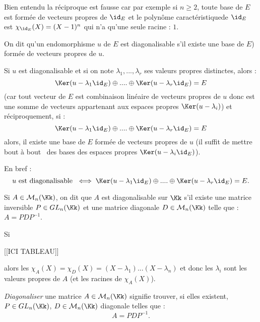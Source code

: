 \documentclass[class=report,crop=false]{standalone}
\newcommand{\GL}{GL}
\begin{document}
\begin{remarque*}
Bien entendu la réciproque est fausse car par exemple si $n \ge 2$, toute base de $E$ est formée de vecteurs propres de $\id_E$ et le polynôme caractéristiquede $\id_E$ est  $\chi_{\id_E}(X)=(X-1)^n$ qui n'a qu'une seule racine : $ 1$. 
\end{remarque*}

\begin{definition}[diagonalisable]
On dit qu'un endomorphisme $u$ de $E$ est diagonalisable  s'il existe une base de $E$) formée de vecteurs propres de $u$.
\end{definition}
\begin{remarque*}
Si $u$ est diagonalisable et si on note $\lambda_1,...,\lambda_r$ ses valeurs propres distinctes, alors :
\[ \Ker (u -\lambda_1\id_E) \oplus .... \oplus \Ker (u-\lambda_r\id_E) = E\]
(car tout vecteur de $E$ est combinaison linéaire de vecteurs propres de $u$ donc est une somme de vecteurs appartenant aux espaces propres $\Ker (u-\lambda_i)$)
et réciproquement, si :
\[\Ker (u -\lambda_1\id_E) \oplus .... \oplus \Ker (u-\lambda_r\id_E) =E\]
alors, il existe une base de $E $ formée de vecteurs propres de $u$ (il suffit de mettre \og bout à bout \fg\ des bases des espaces propres $\Ker (u -\lambda_i\id_E)$).

En bref :
\[u \mbox{ est diagonalisable } \iff \Ker (u -\lambda_1\id_E) \oplus .... \oplus \Ker (u-\lambda_r\id_E) =E .\] 
\end{remarque*}

\begin{definition}
Si $A \in \mathcal{M}_n(\Kk)$, on dit que $A$ est diagonalisable sur $\Kk$ s'il existe une matrice inversible $P \in \GL_n(\Kk)$ et une matrice diagonale $D \in \mathcal{M}_n(\Kk)$ telle que : $A = PDP^{-1}$.
\end{definition}

\begin{remarque*}


Si 

[[ICI TABLEAU]]



alors les $\chi_A(X) = \chi_D(X) = (X-\lambda_1)...(X-\lambda_n)$ et donc les $\lambda_i$ sont les valeurs propres de $A$ (et les racines de $\chi_A(X)$).

\end{remarque*}
{\it Diagonaliser} une matrice $A \in \mathcal{M}_n(\Kk)$ signifie trouver, si elles existent, $P \in \GL_n(\Kk)$, $D \in\mathcal{M}_n(\Kk)$ diagonale telles que :
\[A = PDP^{-1} .\]
\end{document}
